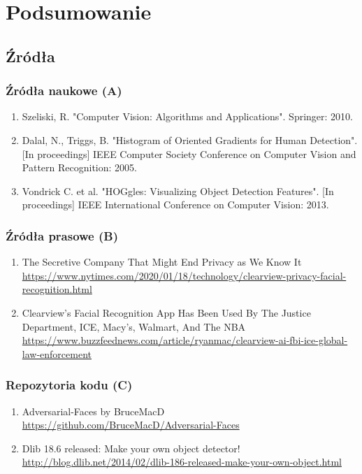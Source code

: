 \documentclass{beamer}
\begin{document}
    \section{Podsumowanie}

        \subsection{Źródła}
            \begin{frame}
                \frametitle{Źródła naukowe (A)}
                \begin{enumerate}
                    \item Szeliski, R. "Computer Vision: Algorithms and Applications". Springer: 2010.
                    \item Dalal, N., Triggs, B. "Histogram of Oriented Gradients for Human Detection". [In proceedings] IEEE Computer Society Conference on Computer Vision and Pattern Recognition: 2005.
                    \item Vondrick C. et al. "HOGgles: Visualizing Object Detection Features". [In proceedings] IEEE International Conference on Computer Vision: 2013.
                \end{enumerate}
            \end{frame}

            \begin{frame}
                \frametitle{Źródła prasowe (B)}
                \begin{enumerate}
                    \item The Secretive Company That Might End Privacy as We Know It
                        \url{https://www.nytimes.com/2020/01/18/technology/clearview-privacy-facial-recognition.html}
                    \item Clearview’s Facial Recognition App Has Been Used By The Justice Department, ICE, Macy’s, Walmart, And The NBA
                        \url{https://www.buzzfeednews.com/article/ryanmac/clearview-ai-fbi-ice-global-law-enforcement}
                \end{enumerate}
            \end{frame}

            \begin{frame}
                \frametitle{Repozytoria kodu (C)}
                \begin{enumerate}
                    \item Adversarial-Faces by BruceMacD
                        \url{https://github.com/BruceMacD/Adversarial-Faces}
                    \item Dlib 18.6 released: Make your own object detector!
                        \url{http://blog.dlib.net/2014/02/dlib-186-released-make-your-own-object.html}
                \end{enumerate}
            \end{frame}
\end{document}
